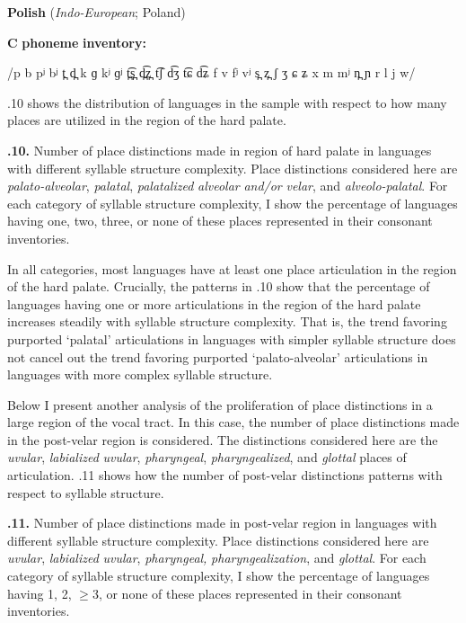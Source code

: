 \ea\label{ex:(4.32)}
   \textbf{Polish} (\textit{Indo-European}; Poland)

\textbf{C} \textbf{phoneme} \textbf{inventory:} 

/p b pʲ bʲ t̪ d̪ k ɡ kʲ ɡʲ t̪͡s̪ d̪͡z̪ t͡ʃ d͡ʒ t͡ɕ d͡ʑ f v fʲ vʲ s̪ z̪ ʃ ʒ ɕ ʑ x m mʲ n̪ ɲ r l j w/
\z

  .10 shows the distribution of languages in the sample with respect to how many places are utilized in the region of the hard palate.

\textbf{.10.} Number of place distinctions made in region of hard palate in languages with different syllable structure complexity. Place distinctions considered here are \textit{palato-alveolar}, \textit{palatal}, \textit{palatalized} \textit{alveolar} \textit{and/or} \textit{velar}, and \textit{alveolo-palatal}. For each category of syllable structure complexity, I show the percentage of languages having one, two, three, or none of these places represented in their consonant inventories.

  In all categories, most languages have at least one place articulation in the region of the hard palate. Crucially, the patterns in .10 show that the percentage of languages having one or more articulations in the region of the hard palate increases steadily with syllable structure complexity. That is, the trend favoring purported ‘palatal’ articulations in languages with simpler syllable structure does not cancel out the trend favoring purported ‘palato-alveolar’ articulations in languages with more complex syllable structure.

  Below I present another analysis of the proliferation of place distinctions in a large region of the vocal tract. In this case, the number of place distinctions made in the post-velar region is considered. The distinctions considered here are the \textit{uvular}, \textit{labialized} \textit{uvular}, \textit{pharyngeal}, \textit{pharyngealized}, and \textit{glottal} places of articulation. .11 shows how the number of post-velar distinctions patterns with respect to syllable structure.

\textbf{.11.} Number of place distinctions made in post-velar region in languages with different syllable structure complexity. Place distinctions considered here are \textit{uvular}, \textit{labialized} \textit{uvular}, \textit{pharyngeal,} \textit{pharyngealization}, and \textit{glottal}. For each category of syllable structure complexity, I show the percentage of languages having 1, 2, ${\geq}$3, or none of these places represented in their consonant inventories.

